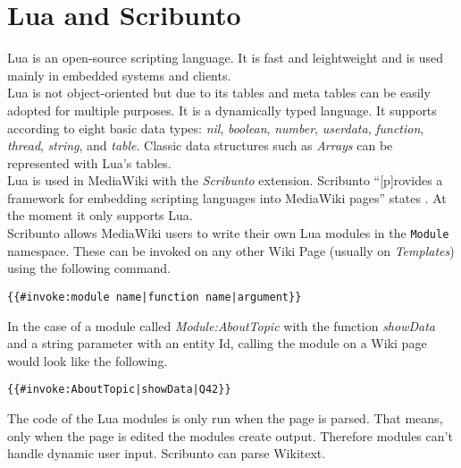 \section{Lua and Scribunto}

Lua is an open-source scripting language. It is fast and leightweight and is used mainly in embedded systems and clients. \citep{lua:01} \\
Lua is not object-oriented but due to its tables and meta tables can be easily adopted for multiple purposes. It is a dynamically typed language. It supports according to \citet[9]{luabook:01} eight basic data types: \textit{nil}, \textit{boolean}, \textit{number}, \textit{userdata}, \textit{function}, \textit{thread}, \textit{string}, and \textit{table}. Classic data structures such as \textit{Arrays} can be represented with Lua's tables. \\
Lua is used in MediaWiki with the \textit{Scribunto} extension. Scribunto ``[p]rovides a framework for embedding scripting languages into MediaWiki pages'' states \citet{wiki:19}. At the moment it only supports Lua. \\
Scribunto allows MediaWiki users to write their own Lua modules in the \texttt{\justify Module} namespace. These can be invoked on any other Wiki Page (usually on \textit{Templates}) using the following command.
\begin{lstlisting}[frame=single] 
{{#invoke:module name|function name|argument}}
\end{lstlisting}

In the case of a module called \textit{Module:AboutTopic} with the function \textit{showData} and a string parameter with an entity Id, calling the module on a Wiki page would look like the following.
\begin{lstlisting}[frame=single] 
{{#invoke:AboutTopic|showData|Q42}}
\end{lstlisting}

The code of the Lua modules is only run when the page is parsed. That means, only when the page is edited the modules create output. Therefore modules can't handle dynamic user input. \citep{wiki:20} Scribunto can parse Wikitext. 
